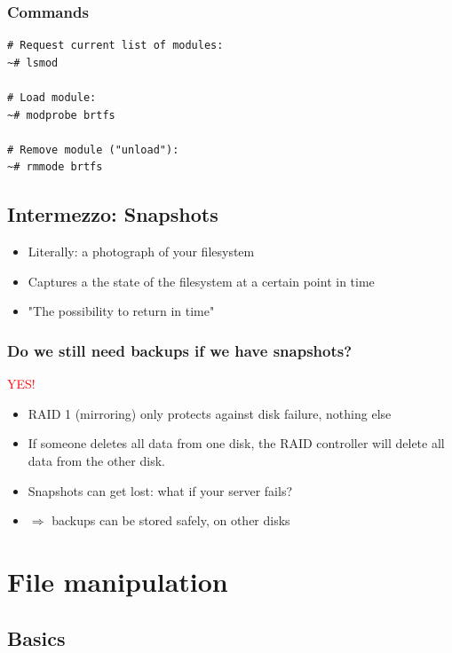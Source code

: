 \documentclass{article}
\begin{document}
\subsubsection{Commands}

\begin{verbatim}
# Request current list of modules:
~# lsmod

# Load module:
~# modprobe brtfs

# Remove module ("unload"):
~# rmmode brtfs

\end{verbatim}

\subsection{Intermezzo: Snapshots}

\begin{itemize}
    \item Literally: a photograph of your filesystem
    \item Captures a the state of the filesystem at a certain point in time
    \item "The possibility to return in time"
\end{itemize}

\subsubsection{Do we still need backups if we have snapshots?}

\textcolor{red}{YES!}

\begin{itemize}
    \item RAID 1 (mirroring) only protects against disk failure, nothing else
    \item If someone deletes all data from one disk, the RAID controller will delete all data from the other disk.
    \item Snapshots can get lost: what if your server fails?
    \item $\Rightarrow$ backups can be stored safely, on other disks
\end{itemize}

\section{File manipulation}

\subsection{Basics}
\end{document}

